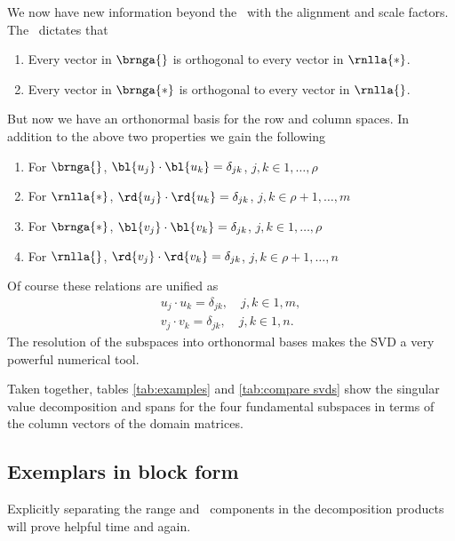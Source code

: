 We now have new information beyond the \ftola \ with the alignment and scale factors. The \ft \ dictates that
\begin{enumerate}
%
  \item Every vector in $\brnga{}$ is orthogonal to every vector in $\rnlla{*}$.
%
  \item Every vector in $\brnga{*}$ is orthogonal to every vector in $\rnlla{}$.
%
\end{enumerate}
But now we have an orthonormal basis for the row and column spaces. In addition to the above two properties we gain the following
\begin{enumerate}
%
  \item For $\brnga{}$, $\bl{u_{j}} \cdot \bl{u_{k}} = \delta_{jk}$, \quad $j,k\in{1, \dots, \rho}$
%
  \item For $\rnlla{*}$, $\rd{u_{j}} \cdot \rd{u_{k}} = \delta_{jk}$, \quad $j,k\in{\rho+1, \dots, m}$
%
  \item For $\brnga{*}$, $\bl{v_{j}} \cdot \bl{v_{k}} = \delta_{jk}$, \quad $j,k\in{1, \dots, \rho}$
%
  \item For $\rnlla{}$, $\rd{v_{j}} \cdot \rd{v_{k}} = \delta_{jk}$, \quad $j,k\in{\rho+1, \dots, n}$
%
\end{enumerate}
Of course these relations are unified as
\begin{equation}
  \begin{split}
    u_{j} \cdot u_{k} = \delta_{jk}, \quad j,k\in{1, m}, \\
    v_{j} \cdot v_{k} = \delta_{jk}, \quad j,k\in{1, n}.
  \end{split}
\end{equation}
The resolution of the subspaces into orthonormal bases makes the SVD a very powerful numerical tool.

Taken together, tables \eqref{tab:examples} and \eqref{tab:compare svds} show the singular value decomposition and spans for the four fundamental subspaces in terms of the column vectors of the domain matrices.
\begin{landscape}
%


%
\end{landscape}

\clearpage
\subsection{Exemplars in block form}
Explicitly separating the range and \ns \ components in the decomposition products will prove helpful time and again. 
%


